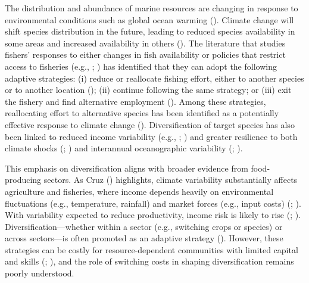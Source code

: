 \documentclass[
  11pt,
]{article}
\begin{document}
The distribution and abundance of marine resources are changing in
response to environmental conditions such as global ocean warming
(). Climate change will shift species distribution in
the future, leading to reduced species availability in some areas and
increased availability in others ().
The literature that studies fishers' responses to either changes in fish
availability or policies that restrict access to fisheries (e.g., ; ) has identified that they
can adopt the following adaptive strategies: (i) reduce or reallocate
fishing effort, either to another species or to another location
(); (ii) continue following the same strategy; or
(iii) exit the fishery and find alternative employment ().
Among these strategies, reallocating effort to alternative species has
been identified as a potentially effective response to climate change
(). Diversification of target species has also been linked
to reduced income variability (e.g., ; )
and greater resilience to both climate shocks (; ) and interannual oceanographic variability
(; ).

This emphasis on diversification aligns with broader evidence from
food-producing sectors. As Cruz () highlights, climate variability
substantially affects agriculture and fisheries, where income depends
heavily on environmental fluctuations (e.g., temperature, rainfall) and
market forces (e.g., input costs) (; ). With
variability expected to reduce productivity, income risk is likely to
rise (; ). Diversification---whether within a sector
(e.g., switching crops or species) or across sectors---is often promoted
as an adaptive strategy (). However, these strategies can
be costly for resource-dependent communities with limited capital and
skills (; ), and the role of switching costs
in shaping diversification remains poorly understood.
\end{document}
